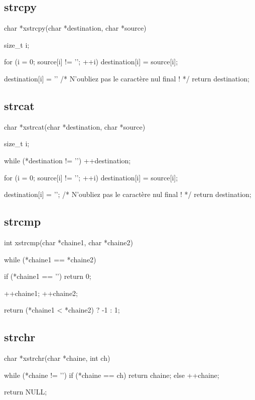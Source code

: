 \subsection{strcpy}
\label{strcpy}

\begin{C}
char *xstrcpy(char *destination, char *source)
{
    size_t i;

    for (i = 0; source[i] != '\0'; ++i)
        destination[i] = source[i];

    destination[i] = '\0' /* N'oubliez pas le caractère nul final ! */
    return destination;
}
\end{C}

\subsection{strcat}
\label{strcat}

\begin{C}
char *xstrcat(char *destination, char *source)
{
    size_t i;

    while (*destination != '\0')
        ++destination;

    for (i = 0; source[i] != '\0'; ++i)
        destination[i] = source[i];

    destination[i] = '\0'; /* N'oubliez pas le caractère nul final ! */
    return destination;
}
\end{C}

\subsection{strcmp}
\label{strcmp}

\begin{C}
int xstrcmp(char *chaine1, char *chaine2)
{
    while (*chaine1 == *chaine2)
    {
        if (*chaine1 == '\0')
            return 0;

        ++chaine1;
        ++chaine2;
    }

    return (*chaine1 < *chaine2) ? -1 : 1;
}
\end{C}

\subsection{strchr}
\label{strchr}

\begin{C}
char *xstrchr(char *chaine, int ch)
{
    while (*chaine != '\0')
        if (*chaine == ch)
            return chaine;
        else
            ++chaine;

    return NULL;
}
\end{C}

